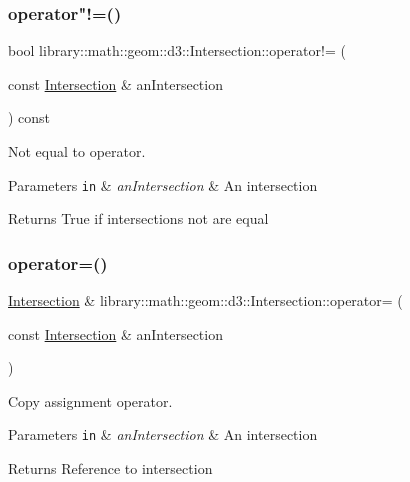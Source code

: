\subsubsection{\texorpdfstring{operator"!=()}{operator!=()}}
{\footnotesize\ttfamily bool library\+::math\+::geom\+::d3\+::\+Intersection\+::operator!= (\begin{DoxyParamCaption}\item[{const \hyperlink{classlibrary_1_1math_1_1geom_1_1d3_1_1_intersection}{Intersection} \&}]{an\+Intersection }\end{DoxyParamCaption}) const}



Not equal to operator. 


\begin{DoxyParams}[1]{Parameters}
\mbox{\tt in}  & {\em an\+Intersection} & An intersection \\
\hline
\end{DoxyParams}
\begin{DoxyReturn}{Returns}
True if intersections not are equal 
\end{DoxyReturn}
\mbox{\label{classlibrary_1_1math_1_1geom_1_1d3_1_1_intersection_a41ca5e5ac6fe7bc3f26f516acde56be8}} 
\subsubsection{\texorpdfstring{operator=()}{operator=()}}
{\footnotesize\ttfamily \hyperlink{classlibrary_1_1math_1_1geom_1_1d3_1_1_intersection}{Intersection} \& library\+::math\+::geom\+::d3\+::\+Intersection\+::operator= (\begin{DoxyParamCaption}\item[{const \hyperlink{classlibrary_1_1math_1_1geom_1_1d3_1_1_intersection}{Intersection} \&}]{an\+Intersection }\end{DoxyParamCaption})}



Copy assignment operator. 


\begin{DoxyParams}[1]{Parameters}
\mbox{\tt in}  & {\em an\+Intersection} & An intersection \\
\hline
\end{DoxyParams}
\begin{DoxyReturn}{Returns}
Reference to intersection 
\end{DoxyReturn}
\mbox{\label{classlibrary_1_1math_1_1geom_1_1d3_1_1_intersection_a4205e2dcace3faa8abfeb829423d0baf}} 
